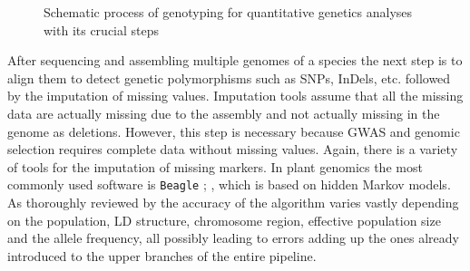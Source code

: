 \begin{figure}[H]
  \begin{center}
    \caption[Schematic process of genotyping for quantitative genetics]{Schematic process of genotyping for quantitative genetics analyses with its crucial steps} \label{fig:quan_flow}
  \end{center}     
\end{figure}

After sequencing and assembling multiple genomes of a species the next step is to align
them to detect genetic polymorphisms such as SNPs, InDels, etc. followed by the imputation
of missing values. Imputation tools assume that all the missing data are actually missing
due to the assembly and not actually missing in the genome as deletions. However, this
step is necessary because GWAS and genomic selection requires complete data without
missing values. Again, there is a variety of tools for the imputation of missing
markers. In plant genomics the most commonly used software is \texttt{Beagle}
\cite{browning2007rapid}; \cite{browning2018one}, which is based on hidden Markov models.
As thoroughly reviewed by \cite{pook2019improving} the accuracy of the algorithm varies
vastly depending on the population, LD structure, chromosome region, effective population
size and the allele frequency, all possibly leading to errors adding up the ones already
introduced to the upper branches of the entire pipeline.

